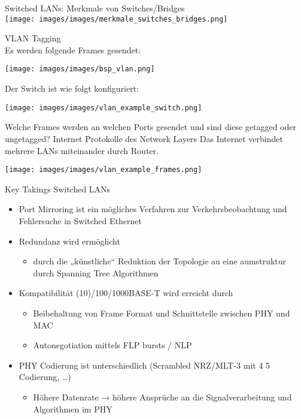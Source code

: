 \begin{theorem}{Switched LANs: Merkmale von Switches/Bridges}\\
    \texttt{[image: images/images/merkmale\_switches\_bridges.png]}
\end{theorem}

\begin{example2}{VLAN Tagging}\\
    Es werden folgende Frames gesendet:
    \begin{center}
        \texttt{[image: images/images/bsp\_vlan.png]}
    \end{center}
    
    Der Switch ist wie folgt konfiguriert:
    \begin{center}
        \texttt{[image: images/images/vlan\_example\_switch.png]}
    \end{center}
    
    Welche Frames werden an welchen Ports gesendet und sind diese getagged oder ungetagged? Internet Protokolle des Network Layers Das Internet verbindet mehrere LANs miteinander durch Router.
    \begin{center}
        \texttt{[image: images/images/vlan\_example\_frames.png]}
    \end{center}
\end{example2}

\begin{KR}{Key Takings Switched LANs}
    \begin{itemize}
        \item Port Mirroring ist ein mögliches Verfahren zur Verkehrsbeobachtung und Fehlersuche in Switched Ethernet
        \item Redundanz wird ermöglicht
        \begin{itemize}
            \item durch die „künstliche“ Reduktion der Topologie au eine aumstruktur durch Spanning Tree Algorithmen
        \end{itemize}
        \item Kompatibilität (10)/100/1000BASE-T wird erreicht durch
        \begin{itemize}
            \item Beibehaltung von Frame Format und Schnittstelle zwischen PHY und MAC
            \item Autonegotiation mittels FLP bursts / NLP
        \end{itemize}
        \item PHY Codierung ist unterschiedlich (Scrambled NRZ/MLT-3 mit 4 5 Codierung, …)
        \begin{itemize}
            \item Höhere Datenrate → höhere Ansprüche an die Signalverarbeitung und Algorithmen im PHY
        \end{itemize}
    \end{itemize}
\end{KR}


